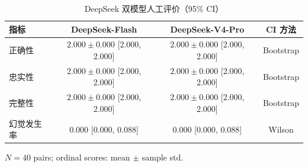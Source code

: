 \begin{table}[htbp]
\centering
\caption{DeepSeek 双模型人工评价（95\% CI）}
\label{tab:deepseek-manual-evaluation}
\begin{tabular}{lccc}
\toprule
指标 & DeepSeek-Flash & DeepSeek-V4-Pro & CI 方法 \\
\midrule
正确性 & $2.000 \pm 0.000$ [2.000, 2.000] & $2.000 \pm 0.000$ [2.000, 2.000] & Bootstrap \\
忠实性 & $2.000 \pm 0.000$ [2.000, 2.000] & $2.000 \pm 0.000$ [2.000, 2.000] & Bootstrap \\
完整性 & $2.000 \pm 0.000$ [2.000, 2.000] & $2.000 \pm 0.000$ [2.000, 2.000] & Bootstrap \\
幻觉发生率 & 0.000 [0.000, 0.088] & 0.000 [0.000, 0.088] & Wilson \\
\bottomrule
\end{tabular}
\par\small $N=40$ pairs; ordinal scores: mean $\pm$ sample std.
\end{table}
